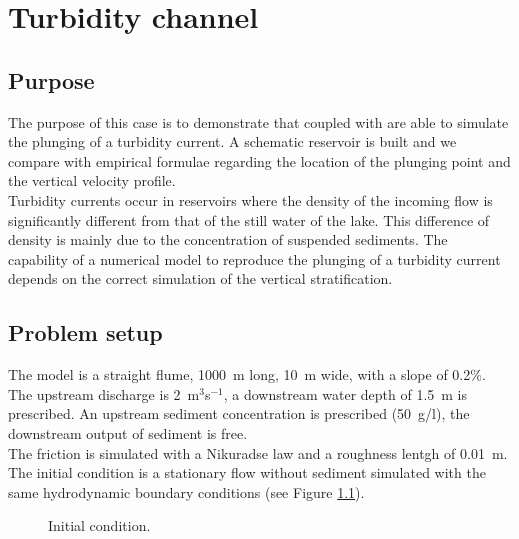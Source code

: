 \chapter{Turbidity channel}
%

%
\section{Purpose}
The purpose of this case is to demonstrate that  coupled with \gaia{} are able to simulate the plunging of a turbidity current.
A schematic reservoir is built and we compare  with empirical formulae regarding the location of the plunging point and the vertical velocity profile.\\

Turbidity currents occur in reservoirs where the density of the incoming flow is significantly different from that of the still water of the lake. This difference of density is mainly due to the concentration of suspended sediments. The capability of a numerical model to reproduce the plunging of a turbidity current depends on the correct simulation of the vertical stratification.

\section{Problem setup}

The model is a straight flume, 1000~m long, 10~m wide, with a slope of 0.2\%. The upstream discharge is 2~m$^3$s$^{-1}$, a downstream water depth of 1.5~m is prescribed. An upstream sediment concentration is prescribed (50~g/l), the downstream output of sediment is free.\\

The friction is simulated with a Nikuradse law and a roughness lentgh of 0.01~m.\\

The initial condition is a stationary flow without sediment simulated with the same hydrodynamic boundary conditions (see Figure \ref{fig:turbidity:initial}).\\

\begin{figure}[H]
 \centering
 \caption{Initial condition.}
 \label{fig:turbidity:initial}
\end{figure}

